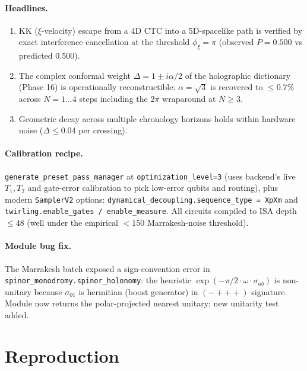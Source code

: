 \documentclass[11pt,a4paper]{article}
\begin{document}
\paragraph{Headlines.}
\begin{enumerate}
\item KK ($\xi$-velocity) escape from a 4D CTC into a 5D-spacelike
  path is verified by exact interference cancellation at the
  threshold $\phi_\xi = \pi$ (observed $P=0.500$ vs predicted $0.500$).
\item The complex conformal weight $\Delta = 1 \pm i\alpha/2$ of the
  holographic dictionary (Phase 16) is operationally reconstructible:
  $\alpha = \sqrt{3}$ is recovered to $\le 0.7\%$ across $N=1\dots4$
  steps including the $2\pi$ wraparound at $N \ge 3$.
\item Geometric decay across multiple chronology horizons holds
  within hardware noise ($\Delta \le 0.04$ per crossing).
\end{enumerate}

\paragraph{Calibration recipe.} \texttt{generate\_preset\_pass\_manager}
at \texttt{optimization\_level=3} (uses backend's live $T_1, T_2$ and
gate-error calibration to pick low-error qubits and routing), plus
modern \texttt{SamplerV2} options: \texttt{dynamical\_decoupling.sequence\_type
= XpXm} and \texttt{twirling.enable\_gates / enable\_measure}. All
circuits compiled to ISA depth $\le 48$ (well under the empirical
$<150$ Marrakesh-noise threshold).

\paragraph{Module bug fix.} The Marrakesh batch exposed a sign-convention
error in \texttt{spinor\_monodromy.spinor\_holonomy}: the heuristic
$\exp(-\pi/2 \cdot \omega \cdot \sigma_{ab})$ is non-unitary because
$\sigma_{01}$ is hermitian (boost generator) in $(-+++)$ signature.
Module now returns the polar-projected nearest unitary; new
unitarity test added.

\section{Reproduction}
\end{document}
